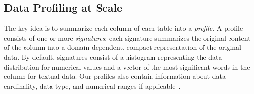 \subsection{Data Profiling at Scale}

The key idea   is to summarize each column of each table into a {\em profile}.
A profile consists of one or more {\it signatures};  each signature summarizes
the original content of the column into a domain-dependent, compact
representation of the original data.  By default, signatures consist of a
histogram representing the data distribution for numerical values and  a vector
of the most significant words in the column for textual data.  Our profiles also
contain information about data cardinality, data type, and numerical ranges if
applicable~\cite{profiling_survey}.


